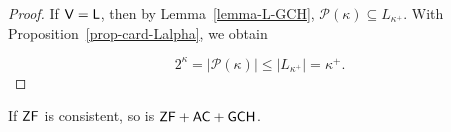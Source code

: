 \begin{theorem}[Gödel]
\end{theorem}\begin{proof}If $\mathsf{V=L}$, then by Lemma~\ref{lemma-L-GCH}, $\mathcal{P}(\kappa) \subseteq L_{\kappa^+}$. With Proposition~\ref{prop-card-Lalpha}, we obtain

\begin{equation}
2^\kappa = |\mathcal{P}(\kappa)| \leq |L_{\kappa^+}| = \kappa^+.
\end{equation}

\end{proof}\begin{corollary}\label{cor-con(zfc+gch)}If $\mathsf{ZF}$ is consistent, so is $\mathsf{ZF} + \mathsf{AC} + \mathsf{GCH}$.

\end{corollary}